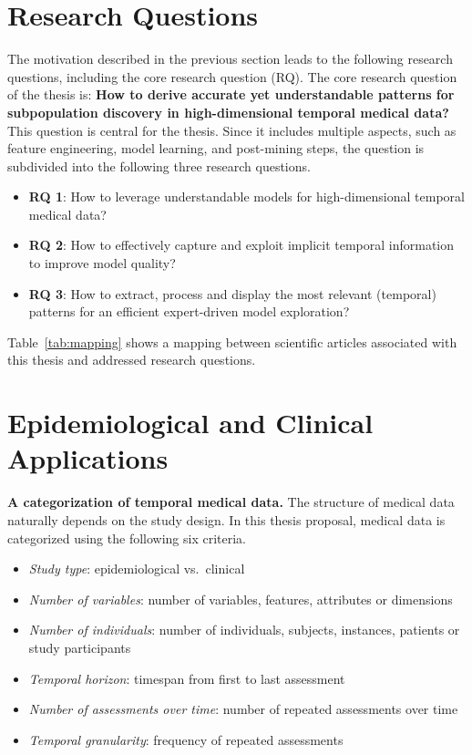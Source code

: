 \documentclass[
]{book}
\providecommand{\tightlist}{%
  \setlength{\itemsep}{0pt}\setlength{\parskip}{0pt}}
\begin{document}
\hypertarget{research-questions}{%
\section{Research Questions}\label{research-questions}}

The motivation described in the previous section leads to the following research questions, including the core research question (RQ).
The core research question of the thesis is: \textbf{How to derive accurate yet understandable patterns for subpopulation discovery in high-dimensional temporal medical data?}
This question is central for the thesis. Since it includes multiple aspects, such as feature engineering, model learning, and post-mining steps, the question is subdivided into the following three research questions.

\begin{itemize}
\tightlist
\item
  \textbf{RQ 1}: How to leverage understandable models for high-dimensional temporal medical data?
\item
  \textbf{RQ 2}: How to effectively capture and exploit implicit temporal information to improve model quality?
\item
  \textbf{RQ 3}: How to extract, process and display the most relevant (temporal) patterns for an efficient expert-driven model exploration?
\end{itemize}

Table~\ref{tab:mapping} shows a mapping between scientific articles associated with this thesis and addressed research questions.

\hypertarget{epidemiological-and-clinical-applications}{%
\section{Epidemiological and Clinical Applications}\label{epidemiological-and-clinical-applications}}

\textbf{A categorization of temporal medical data.} The structure of medical data naturally depends on the study design.
In this thesis proposal, medical data is categorized using the following six criteria.

\begin{itemize}
\tightlist
\item
  \emph{Study type}: epidemiological vs.~clinical
\item
  \emph{Number of variables}: number of variables, features, attributes or dimensions
\item
  \emph{Number of individuals}: number of individuals, subjects, instances, patients or study participants
\item
  \emph{Temporal horizon}: timespan from first to last assessment
\item
  \emph{Number of assessments over time}: number of repeated assessments over time
\item
  \emph{Temporal granularity}: frequency of repeated assessments
\end{itemize}
\end{document}
